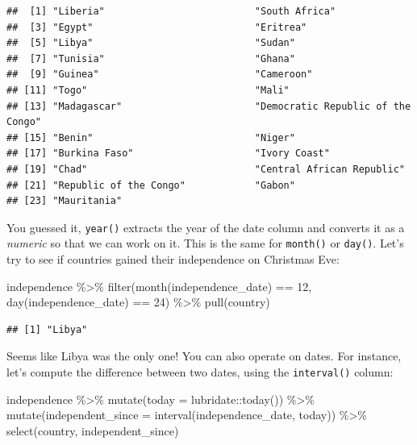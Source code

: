 \documentclass[
]{article}
\newenvironment{Shaded}{\begin{snugshade}}{\end{snugshade}}
\newcommand{\AttributeTok}[1]{\textcolor[rgb]{0.77,0.63,0.00}{#1}}
\newcommand{\DecValTok}[1]{\textcolor[rgb]{0.00,0.00,0.81}{#1}}
\newcommand{\FunctionTok}[1]{\textcolor[rgb]{0.00,0.00,0.00}{#1}}
\newcommand{\NormalTok}[1]{#1}
\newcommand{\SpecialCharTok}[1]{\textcolor[rgb]{0.00,0.00,0.00}{#1}}
\begin{document}
\begin{verbatim}
##  [1] "Liberia"                          "South Africa"                    
##  [3] "Egypt"                            "Eritrea"                         
##  [5] "Libya"                            "Sudan"                           
##  [7] "Tunisia"                          "Ghana"                           
##  [9] "Guinea"                           "Cameroon"                        
## [11] "Togo"                             "Mali"                            
## [13] "Madagascar"                       "Democratic Republic of the Congo"
## [15] "Benin"                            "Niger"                           
## [17] "Burkina Faso"                     "Ivory Coast"                     
## [19] "Chad"                             "Central African Republic"        
## [21] "Republic of the Congo"            "Gabon"                           
## [23] "Mauritania"
\end{verbatim}

You guessed it, \texttt{year()} extracts the year of the date column and converts it as a \emph{numeric} so that we can work
on it. This is the same for \texttt{month()} or \texttt{day()}. Let's try to see if countries gained their independence on
Christmas Eve:

\begin{Shaded}
\begin{Highlighting}[]
\NormalTok{independence }\SpecialCharTok{\%\textgreater{}\%}
  \FunctionTok{filter}\NormalTok{(}\FunctionTok{month}\NormalTok{(independence\_date) }\SpecialCharTok{==} \DecValTok{12}\NormalTok{,}
         \FunctionTok{day}\NormalTok{(independence\_date) }\SpecialCharTok{==} \DecValTok{24}\NormalTok{) }\SpecialCharTok{\%\textgreater{}\%}
  \FunctionTok{pull}\NormalTok{(country)}
\end{Highlighting}
\end{Shaded}

\begin{verbatim}
## [1] "Libya"
\end{verbatim}

Seems like Libya was the only one! You can also operate on dates. For instance, let's compute the difference between
two dates, using the \texttt{interval()} column:

\begin{Shaded}
\begin{Highlighting}[]
\NormalTok{independence }\SpecialCharTok{\%\textgreater{}\%}
  \FunctionTok{mutate}\NormalTok{(}\AttributeTok{today =}\NormalTok{ lubridate}\SpecialCharTok{::}\FunctionTok{today}\NormalTok{()) }\SpecialCharTok{\%\textgreater{}\%}
  \FunctionTok{mutate}\NormalTok{(}\AttributeTok{independent\_since =} \FunctionTok{interval}\NormalTok{(independence\_date, today)) }\SpecialCharTok{\%\textgreater{}\%}
  \FunctionTok{select}\NormalTok{(country, independent\_since)}
\end{Highlighting}
\end{Shaded}
\end{document}

